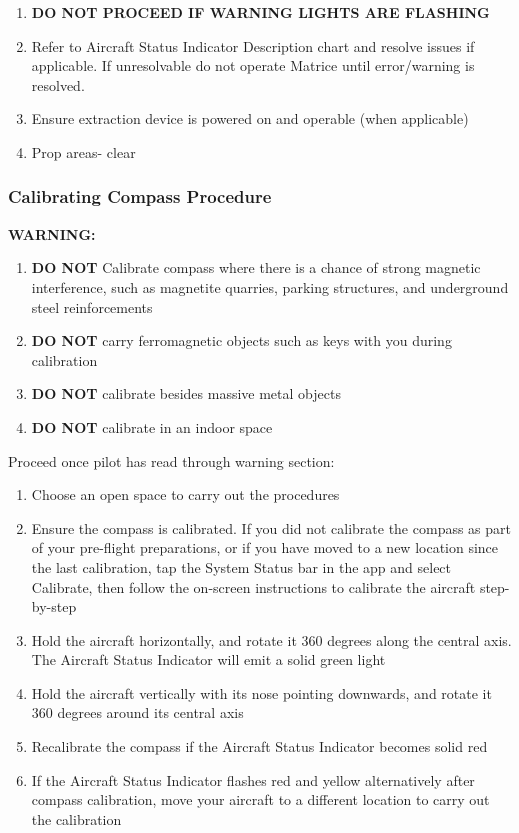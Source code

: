 \begin{enumerate}
\begin{figure}[h]
\begin{center}
\end{center}
\end{figure}  
\item \textbf{DO NOT PROCEED IF WARNING LIGHTS ARE FLASHING}
\item Refer to Aircraft Status Indicator Description chart and resolve issues if applicable. If unresolvable do not operate Matrice until error/warning is resolved. 
\item Ensure extraction device is powered on and operable (when applicable)
\item Prop areas- clear 
\end{enumerate}



\clearpage
\subsubsection{Calibrating Compass Procedure}
\textbf{WARNING:}
\begin{enumerate}
\setlength{\itemsep}{0em}
\setlength{\parskip}{0em}
\item \textbf{DO NOT} Calibrate compass where there is a chance of strong magnetic interference, such as magnetite quarries, parking structures, and underground steel reinforcements
\item \textbf{DO NOT} carry ferromagnetic objects such as keys with you during calibration
\item \textbf{DO NOT} calibrate besides massive metal objects
\item \textbf{DO NOT} calibrate in an indoor space
\end{enumerate}

Proceed once pilot has read through warning section:
\begin{enumerate}
\setlength{\itemsep}{0em}
\setlength{\parskip}{0em}
\item Choose an open space to carry out the procedures
\item Ensure the compass is calibrated. If you did not calibrate the compass as part of your pre-flight preparations, or if you have moved to a new location since the last calibration, tap the System Status bar in the app and select Calibrate, then follow the on-screen instructions to calibrate the aircraft step-by-step
\item Hold the aircraft horizontally, and rotate it 360 degrees along the central axis. The Aircraft Status Indicator will emit a solid green light
\item Hold the aircraft vertically with its nose pointing downwards, and rotate it 360 degrees around its central axis 
\item Recalibrate the compass if the Aircraft Status Indicator becomes solid red
\item If the Aircraft Status Indicator flashes red and yellow alternatively after compass calibration, move your aircraft to a different location to carry out the calibration
\end{enumerate}

